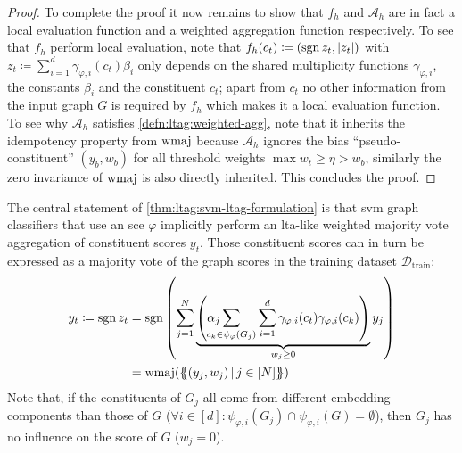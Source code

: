 \begin{proof}
	To complete the proof it now remains to show that $f_h$ and $\mathcal{A}_h$ are in fact a local evaluation function and a weighted aggregation function respectively.
	To see that $f_h$ perform local evaluation, note that $f_h(c_t) \coloneqq (\operatorname{sgn} z_t, {|z_t|})$ with $z_t \coloneqq \sum_{i=1}^{d} \gamma_{\varphi,i}(c_t) \beta_i$ only depends on the shared multiplicity functions $\gamma_{\varphi,i}$, the constants $\beta_i$ and the constituent $c_t$;
	apart from $c_t$ no other information from the input graph $G$ is required by $f_h$ which makes it a local evaluation function.
	To see why $\mathcal{A}_h$ satisfies \cref{defn:ltag:weighted-agg}, note that it inherits the idempotency property from $\operatorname{wmaj}$ because $\mathcal{A}_h$ ignores the bias ``pseudo-constituent'' $(y_b, w_b)$ for all threshold weights $\max w_t \geq \eta > w_b$, similarly the zero invariance of $\operatorname{wmaj}$ is also directly inherited.
	This concludes the proof.
\end{proof}

The central statement of \cref{thm:ltag:svm-ltag-formulation} is that \acs{svm} graph classifiers that use an \ac{sce} $\varphi$ implicitly perform an \acs{lta}-like weighted majority vote aggregation of constituent scores $y_t$.
Those constituent scores can in turn be expressed as a majority vote of the graph scores in the training dataset $\mathcal{D}_{\text{train}}$:
\begin{align}
	y_t \coloneqq \sgn z_t
	 &= \sgn\left( \sum_{j=1}^N \underbrace{\left( \alpha_j \smashoperator[l]{\sum_{c_k \in \psi_{\varphi}(G_j)}} \sum_{i=1}^d \gamma_{\varphi,i}(c_t) \gamma_{\varphi,i}(c_k) \right)}_{w_j \geq 0} y_j \right) \\
	 &= \wmaj(\ldblbrace (y_j, w_j)\, |\, j \in [N] \rdblbrace) \nonumber
\end{align}
Note that, if the constituents of $G_j$ all come from different embedding components than those of $G$ ($\forall i \in [d]: {\psi_{\varphi, i}(G_j) \cap \psi_{\varphi, i}(G)} = \emptyset$), then $G_j$ has no influence on the score of $G$ ($w_j = 0$).

